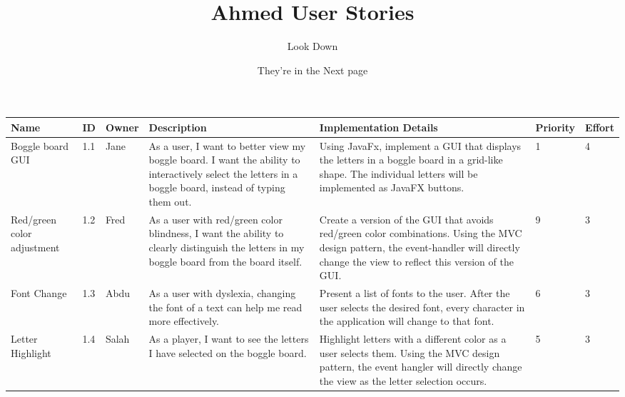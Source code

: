 \documentclass[12pt]{article}
\title{Ahmed User Stories}
\author{Look Down}
\date{They're in the Next page}
\begin{document}
\maketitle


    \begin{center}
      \begin{tabular}{|p{2cm}|p{0.5cm}|p{1.5cm}|p{3cm}|p{3.5cm}|p{1.75cm}|p{1.25cm}|}
        \hline
        \textbf{Name}&\textbf{ID} &\textbf{Owner}&\textbf{Description}&\textbf{Implementation Details}&\textbf{Priority}&\textbf{Effort}
        \\\hline    
        Boggle board GUI	
        &1.1
        &Jane
        &As a user, I want to better view my boggle board. I want the ability to interactively select the letters in a boggle board, instead of typing them out.
        &Using JavaFx, implement a GUI that displays the letters in a boggle board in a grid-like shape. The individual letters will be implemented as JavaFX buttons.
        &1
        &4
        \\\hline    
        Red/green color adjustment	
        &1.2
        &Fred
        &As a user with red/green color blindness, I want the ability to clearly distinguish the letters in my boggle board from the board itself.
        &Create a version of the GUI that avoids red/green color combinations. Using the MVC design pattern, the event-handler will directly change the view to reflect this version of the GUI.
        &9
        &3      
        \\\hline        
        Font Change
        &1.3
        &Abdu
        &As a user with dyslexia, changing the font of a text can help me read more effectively. 
        &Present a list of fonts to the user. After the user selects the desired font, every character in the application will change to that font. 
        &6
        &3      
        \\\hline  
         Letter Highlight
        &1.4
        &Salah
        &As a player, I want to see the letters I have selected on the boggle board. 
        &Highlight letters with a different color as a user selects them. Using the MVC design pattern, the event hangler will directly change the view as the letter selection occurs. 

        &5
        &3      
        \\\hline  
    
      \end{tabular}
    \end{center}
    
\end{document}
